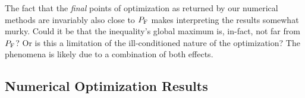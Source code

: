 \documentclass[aps, 10pt, english, twoside, pra, nofootinbib, tightenlines, longbibliography, superscriptaddress]{revtex4-1}
\begin{document}
    The fact that the \emph{final} points of optimization as returned by our numerical methods are invariably also close to $\prob[\fritz]$ makes interpreting the results somewhat murky. Could it be that the inequality's global maximum is, in-fact, not far from $\prob[\fritz]$? Or is this a limitation of the ill-conditioned nature of the optimization? The phenomena is likely due to a combination of both effects.


    \subsection{Numerical Optimization Results}\label{sec:optima}
\end{document}
